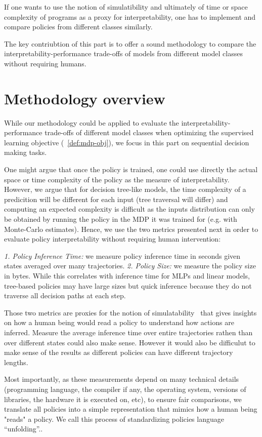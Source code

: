 If one wants to use the notion of simulatibility and ultimately of time or space complexity of programs as a proxy for interpretability, one has to implement and compare policies from different classes similarly.

The key contriubtion of this part is to offer a sound methodology to compare the interpretability-performance trade-offs of models from different model classes without requiring humans.

\section{Methodology overview}\label{sec:unfold}
While our methodology could be applied to evaluate the interpretability-performance trade-offs of different model classes when optimizing the supervised learning objective (~\ref{def:mdp-obj}), we focus in this part on sequential decision making tasks.

One might argue that once the policy is trained, one could use directly the actual space or time complexity of the policy as the measure of interpretability.
However, we argue that for decision tree-like models, the time complexity of a predicition will be different for each input (tree traversal will differ) and computing an expected complexity is difficult as the inputs distribution can only be obtained by running the policy in the MDP it was trained for (e.g. with Monte-Carlo estimates).  
Hence, we use the two metrics presented next in order to evaluate policy interpretability without requiring human intervention:

\textit{1. Policy Inference Time:} we measure policy inference time in seconds given states averaged over many trajectories.
\textit{2. Policy Size:} we measure the policy size in bytes. While this correlates with inference time for MLPs and linear models, tree-based policies may have large sizes but quick inference because they do not traverse all decision paths at each step.

Those two metrics are proxies for the notion of simulatability~\cite{lipton} that gives insights on how a human being would read a policy to understand how actions are inferred.
Measure the average inference time over entire trajectories rathen than over different states could also make sense.
However it would also be difficulut to make sense of the results as different policies can have different trajectory lengths.

Most importantly, as these measurements depend on many technical details (programming language, the compiler if any, the operating system, versions of libraries, the hardware it is executed on, etc), to ensure fair comparisons, we translate all policies into a simple representation that mimics how a human being "reads" a policy.
We call this process of standardizing policies language ``unfolding''..

